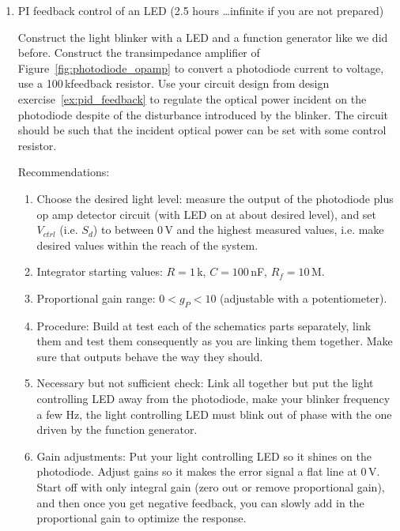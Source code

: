 \documentclass{article}
\begin{document}
\begin{enumerate}
\item PI feedback control of an LED (2.5 hours \ldots infinite if you are not prepared)

Construct the light blinker with a LED and a function generator like we did before. Construct the transimpedance amplifier of Figure~\ref{fig:photodiode_opamp} to convert a photodiode current to voltage, use a 100\,k\Ohm feedback resistor. Use your circuit design from design exercise~\ref{ex:pid_feedback} to regulate the optical power incident on the photodiode despite of the disturbance introduced by the blinker. The circuit should be such that the incident optical power can be set with some control resistor.

Recommendations:
\begin{enumerate}
\item Choose the desired light level: measure the output of the photodiode plus op amp detector circuit (with LED on at about desired level), and set $V_{ctrl}$ (i.e. $S_d$) to between 0\,V and the highest measured values, i.e. make desired values within the reach of the system.
\item Integrator starting values: $R = 1$\,k\Ohm, $C = 100$\,nF, $R_f = 10$\,M\Ohm.
\item Proportional gain range: $0 < g_P < 10$ (adjustable with a potentiometer).
\item Procedure: Build at test each of the schematics parts separately, link them and test them consequently as you are linking them together. Make sure that outputs behave the way they should.
\item Necessary but not sufficient check: Link all together but put the light controlling LED away from the photodiode, make your blinker frequency a few Hz, the light controlling LED must blink out of phase with the one driven by the function generator.
\item Gain adjustments: Put your light controlling LED so it shines on the photodiode. Adjust gains so it makes the error signal a flat line at 0\,V. Start off with only integral gain (zero out or remove proportional gain), and then once you get negative feedback, you can slowly add in the proportional gain to optimize the response.
\end{enumerate}


\end{enumerate}
\end{document}
